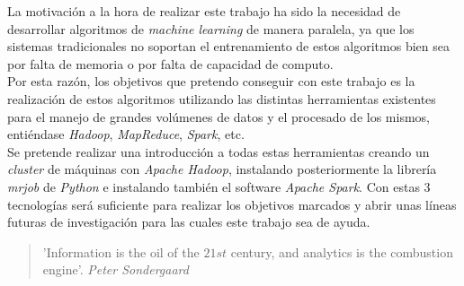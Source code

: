 La motivación a la hora de realizar este trabajo ha sido la necesidad de desarrollar algoritmos 
de \textit{machine learning} de manera paralela, ya que los sistemas tradicionales no soportan 
el entrenamiento de estos algoritmos bien sea por falta de memoria o por falta de capacidad de computo.\\
Por esta razón, los objetivos que pretendo conseguir con este trabajo es la realización de estos 
algoritmos utilizando las distintas herramientas existentes para el manejo de grandes volúmenes de 
datos y el procesado de los mismos, entiéndase \textit{Hadoop}, \textit{MapReduce}, \textit{Spark}, etc.\\
Se pretende realizar una introducción a todas estas herramientas creando un \textit{cluster} de 
máquinas con \textit{Apache Hadoop}, instalando posteriormente la librería \textit{mrjob} de \textit{Python} e 
instalando también el software \textit{Apache Spark}. Con estas 3 tecnologías será suficiente para 
realizar los objetivos marcados y abrir unas líneas futuras de investigación para las cuales este 
trabajo sea de ayuda.

\vspace*{1.5cm}

\begin{quote}
    'Information is the oil of the $21st$ century, and analytics is the combustion engine'.
	 \newline \raggedleft \textit{Peter Sondergaard}
\end{quote}

\clearpage